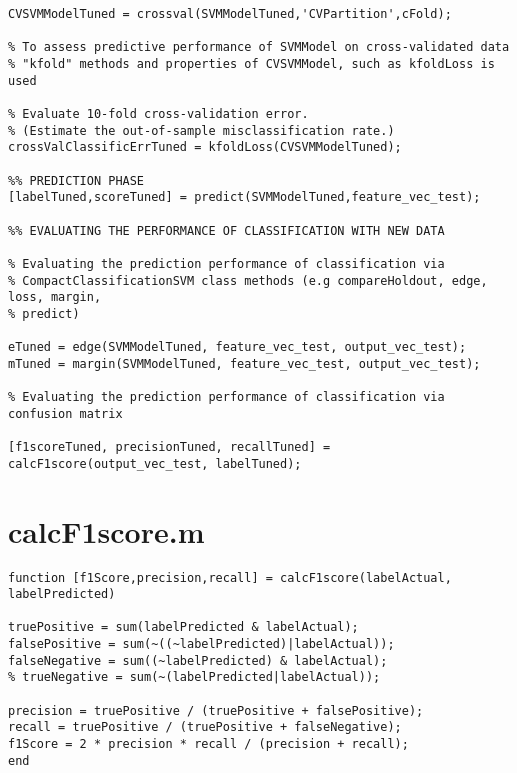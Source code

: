 \begin{lstlisting}
CVSVMModelTuned = crossval(SVMModelTuned,'CVPartition',cFold);

% To assess predictive performance of SVMModel on cross-validated data 
% "kfold" methods and properties of CVSVMModel, such as kfoldLoss is used

% Evaluate 10-fold cross-validation error.
% (Estimate the out-of-sample misclassification rate.)
crossValClassificErrTuned = kfoldLoss(CVSVMModelTuned);

%% PREDICTION PHASE
[labelTuned,scoreTuned] = predict(SVMModelTuned,feature_vec_test);

%% EVALUATING THE PERFORMANCE OF CLASSIFICATION WITH NEW DATA

% Evaluating the prediction performance of classification via
% CompactClassificationSVM class methods (e.g compareHoldout, edge, loss, margin, 
% predict)

eTuned = edge(SVMModelTuned, feature_vec_test, output_vec_test);
mTuned = margin(SVMModelTuned, feature_vec_test, output_vec_test);

% Evaluating the prediction performance of classification via confusion matrix

[f1scoreTuned, precisionTuned, recallTuned] = calcF1score(output_vec_test, labelTuned);
 \end{lstlisting}
 
 
 
  \section{calcF1score.m}
\begin{lstlisting}
function [f1Score,precision,recall] = calcF1score(labelActual, labelPredicted)

truePositive = sum(labelPredicted & labelActual);
falsePositive = sum(~((~labelPredicted)|labelActual));
falseNegative = sum((~labelPredicted) & labelActual);
% trueNegative = sum(~(labelPredicted|labelActual));

precision = truePositive / (truePositive + falsePositive);
recall = truePositive / (truePositive + falseNegative);
f1Score = 2 * precision * recall / (precision + recall);
end
 \end{lstlisting}
 
 

